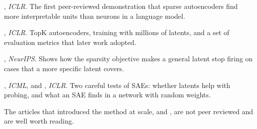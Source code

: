 \begin{readinglist}
\item \citet{cunningham2024sparse}, \emph{ICLR}. The first peer-reviewed demonstration that sparse autoencoders
find more interpretable units than neurons in a language model.
\item \citet{gao2025scaling}, \emph{ICLR}. TopK autoencoders, training with millions of latents, and a set of
evaluation metrics that later work adopted.
\item \citet{chanin2024absorption}, \emph{NeurIPS}. Shows how the sparsity objective makes a general latent stop
firing on cases that a more specific latent covers.
\item \citet{kantamneni2025sparse}, \emph{ICML}, and \citet{heap2025sparse}, \emph{ICLR}. Two careful tests of SAEs: whether latents help with probing, and what an SAE finds in a network with random
weights.
\item The articles that introduced the method at scale, \citet{bricken2023monosemanticity} and
\citet{templeton2024scaling}, are not peer reviewed and are well worth reading.
\end{readinglist}
